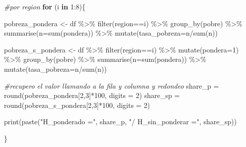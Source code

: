 \documentclass[
]{book}
\newenvironment{Shaded}{\begin{snugshade}}{\end{snugshade}}
\newcommand{\AttributeTok}[1]{\textcolor[rgb]{0.77,0.63,0.00}{#1}}
\newcommand{\CommentTok}[1]{\textcolor[rgb]{0.56,0.35,0.01}{\textit{#1}}}
\newcommand{\ControlFlowTok}[1]{\textcolor[rgb]{0.13,0.29,0.53}{\textbf{#1}}}
\newcommand{\DecValTok}[1]{\textcolor[rgb]{0.00,0.00,0.81}{#1}}
\newcommand{\FunctionTok}[1]{\textcolor[rgb]{0.00,0.00,0.00}{#1}}
\newcommand{\NormalTok}[1]{#1}
\newcommand{\OtherTok}[1]{\textcolor[rgb]{0.56,0.35,0.01}{#1}}
\newcommand{\SpecialCharTok}[1]{\textcolor[rgb]{0.00,0.00,0.00}{#1}}
\newcommand{\StringTok}[1]{\textcolor[rgb]{0.31,0.60,0.02}{#1}}
\begin{document}
\begin{Shaded}
\begin{Highlighting}[]
\CommentTok{\#por region}
\ControlFlowTok{for}\NormalTok{ (i }\ControlFlowTok{in} \DecValTok{1}\SpecialCharTok{:}\DecValTok{8}\NormalTok{)\{}
  
\NormalTok{  pobreza\_pondera }\OtherTok{\textless{}{-}}\NormalTok{ df }\SpecialCharTok{\%\textgreater{}\%} \FunctionTok{filter}\NormalTok{(region}\SpecialCharTok{==}\NormalTok{i) }\SpecialCharTok{\%\textgreater{}\%} \FunctionTok{group\_by}\NormalTok{(pobre) }\SpecialCharTok{\%\textgreater{}\%} \FunctionTok{summarise}\NormalTok{(}\AttributeTok{n=}\FunctionTok{sum}\NormalTok{(pondera)) }\SpecialCharTok{\%\textgreater{}\%} 
                                                                  \FunctionTok{mutate}\NormalTok{(}\AttributeTok{tasa\_pobreza=}\NormalTok{n}\SpecialCharTok{/}\FunctionTok{sum}\NormalTok{(n))}
  
\NormalTok{  pobreza\_s\_pondera }\OtherTok{\textless{}{-}}\NormalTok{ df }\SpecialCharTok{\%\textgreater{}\%} \FunctionTok{filter}\NormalTok{(region}\SpecialCharTok{==}\NormalTok{i) }\SpecialCharTok{\%\textgreater{}\%} \FunctionTok{mutate}\NormalTok{(}\AttributeTok{pondera=}\DecValTok{1}\NormalTok{) }\SpecialCharTok{\%\textgreater{}\%} \FunctionTok{group\_by}\NormalTok{(pobre) }\SpecialCharTok{\%\textgreater{}\%} \FunctionTok{summarise}\NormalTok{(}\AttributeTok{n=}\FunctionTok{sum}\NormalTok{(pondera)) }\SpecialCharTok{\%\textgreater{}\%}
                                                                                      \FunctionTok{mutate}\NormalTok{(}\AttributeTok{tasa\_pobreza=}\NormalTok{n}\SpecialCharTok{/}\FunctionTok{sum}\NormalTok{(n))}
  
  \CommentTok{\#recupero el valor llamando a la fila y columna y redondeo }
\NormalTok{  share\_p }\OtherTok{=} \FunctionTok{round}\NormalTok{(pobreza\_pondera[}\DecValTok{2}\NormalTok{,}\DecValTok{3}\NormalTok{]}\SpecialCharTok{*}\DecValTok{100}\NormalTok{, }\AttributeTok{digits =} \DecValTok{2}\NormalTok{)}
\NormalTok{  share\_sp }\OtherTok{=} \FunctionTok{round}\NormalTok{(pobreza\_s\_pondera[}\DecValTok{2}\NormalTok{,}\DecValTok{3}\NormalTok{]}\SpecialCharTok{*}\DecValTok{100}\NormalTok{, }\AttributeTok{digits =} \DecValTok{2}\NormalTok{)}
  
  \FunctionTok{print}\NormalTok{(}\FunctionTok{paste}\NormalTok{(}\StringTok{"H\_ponderado ="}\NormalTok{, share\_p, }\StringTok{"/ H\_sin\_ponderar ="}\NormalTok{, share\_sp))}
  
\NormalTok{\}}
\end{Highlighting}
\end{Shaded}
\end{document}
